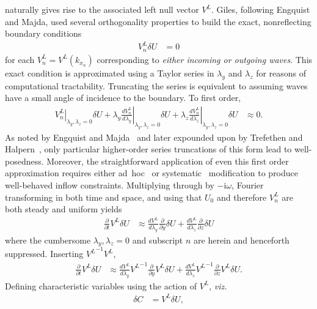 \documentclass[letterpaper,11pt,nointlimits,reqno,draft]{amsart}
\newcommand{\ii}{\ensuremath{\mathrm{i}}}
\begin{document}
naturally gives rise to the associated left null vector $V^L$.  Giles,
following Engquist and Majda, used several orthogonality properties to build
the exact, nonreflecting boundary conditions
\begin{align}
\label{eq:dimeulerexact}
  V_n^L \delta{}U &= 0
\end{align}
for each $V_n^L = V^L\!\left(k_{x_n}\right)$ corresponding to \textit{either
incoming or outgoing waves}.  This exact condition is approximated using a
Taylor series in $\lambda_y$ and $\lambda_z$ for reasons of computational
tractability.  Truncating the series is equivalent to assuming waves have a
small angle of incidence to the boundary.  To first order,
\begin{align}
  \left.V_n^L\right|_{\lambda_y,\lambda_z=0}
  \delta{}U
  +
  \lambda_y
  \left.\frac{dV_n^L}{d\lambda_y}\right|_{\lambda_y,\lambda_z=0}
  \delta{}U
  +
  \lambda_z
  \left.\frac{dV_n^L}{d\lambda_z}\right|_{\lambda_y,\lambda_z=0}
  \delta{}U
  &\approx 0
  .
\end{align}
As noted by Engquist and Majda~\cite{Engquist1977Absorbing} and later expounded
upon by Trefethen and Halpern~\cite{Trefethen1986Wellposedness}, only
particular higher-order series truncations of this form lead to well-posedness.
Moreover, the straightforward application of even this first order
approximation requires either ad~hoc~\cite{Giles1988Nonreflecting,Medida2007}
or systematic~\cite{Rowley2000Discretely} modification to produce well-behaved
inflow constraints.  Multiplying through by $-\ii\omega$, Fourier transforming
in both time and space, and using that $U_0$ and therefore $V_n^L$ are both
steady and uniform yields
\begin{align}
\label{eq:dimeulerapprox}
  \frac{\partial}{\partial{}t}
  V^L
  \delta{}U
  &\approx
  \frac{dV^L}{d\lambda_y}
  \frac{\partial}{\partial{}y}\delta{}U
  +
  \frac{dV^L}{d\lambda_z}
  \frac{\partial}{\partial{}z}\delta{}U
\end{align}
where the cumbersome $\lambda_y,\lambda_z=0$ and subscript $n$ are herein
and henceforth suppressed.  Inserting ${V^L}^{-1} V^L$,
\begin{align}
  \frac{\partial}{\partial{}t}
  V^L
  \delta{}U
  &\approx
  \frac{dV^L}{d\lambda_y}
  {V^L}^{-1}
  \frac{\partial}{\partial{}y}
  V^L
  \delta{}U
  +
  \frac{dV^L}{d\lambda_z}
  {V^L}^{-1}
  \frac{\partial}{\partial{}z}
  V^L
  \delta{}U
.
\end{align}
Defining characteristic variables using the action of $V^L$, \textit{viz.}
\begin{align}
  \delta{}C &= V^L \delta{}U
  ,
\end{align}
\end{document}
